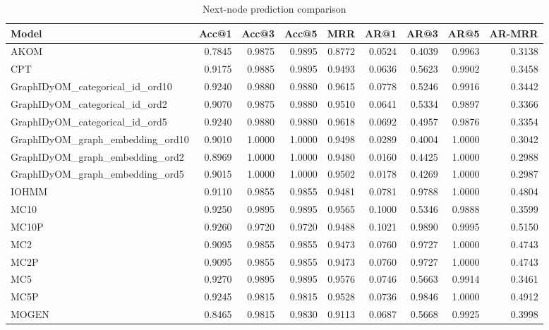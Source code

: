 \begin{table}
\caption{Next-node prediction comparison}
\label{tab:comparison}
\begin{tabular}{lrrrrrrrr}
\toprule
Model & Acc@1 & Acc@3 & Acc@5 & MRR & AR@1 & AR@3 & AR@5 & AR-MRR \\
\midrule
AKOM & 0.7845 & 0.9875 & 0.9895 & 0.8772 & 0.0524 & 0.4039 & 0.9963 & 0.3138 \\
CPT & 0.9175 & 0.9885 & 0.9895 & 0.9493 & 0.0636 & 0.5623 & 0.9902 & 0.3458 \\
GraphIDyOM_categorical_id_ord10 & 0.9240 & 0.9880 & 0.9880 & 0.9615 & 0.0778 & 0.5246 & 0.9916 & 0.3442 \\
GraphIDyOM_categorical_id_ord2 & 0.9070 & 0.9875 & 0.9880 & 0.9510 & 0.0641 & 0.5334 & 0.9897 & 0.3366 \\
GraphIDyOM_categorical_id_ord5 & 0.9240 & 0.9880 & 0.9880 & 0.9618 & 0.0692 & 0.4957 & 0.9876 & 0.3354 \\
GraphIDyOM_graph_embedding_ord10 & 0.9010 & 1.0000 & 1.0000 & 0.9498 & 0.0289 & 0.4004 & 1.0000 & 0.3042 \\
GraphIDyOM_graph_embedding_ord2 & 0.8969 & 1.0000 & 1.0000 & 0.9480 & 0.0160 & 0.4425 & 1.0000 & 0.2988 \\
GraphIDyOM_graph_embedding_ord5 & 0.9015 & 1.0000 & 1.0000 & 0.9502 & 0.0178 & 0.4269 & 1.0000 & 0.2987 \\
IOHMM & 0.9110 & 0.9855 & 0.9855 & 0.9481 & 0.0781 & 0.9788 & 1.0000 & 0.4804 \\
MC10 & 0.9250 & 0.9895 & 0.9895 & 0.9565 & 0.1000 & 0.5346 & 0.9888 & 0.3599 \\
MC10P & 0.9260 & 0.9720 & 0.9720 & 0.9488 & 0.1021 & 0.9890 & 0.9995 & 0.5150 \\
MC2 & 0.9095 & 0.9855 & 0.9855 & 0.9473 & 0.0760 & 0.9727 & 1.0000 & 0.4743 \\
MC2P & 0.9095 & 0.9855 & 0.9855 & 0.9473 & 0.0760 & 0.9727 & 1.0000 & 0.4743 \\
MC5 & 0.9270 & 0.9895 & 0.9895 & 0.9576 & 0.0746 & 0.5663 & 0.9914 & 0.3461 \\
MC5P & 0.9245 & 0.9815 & 0.9815 & 0.9528 & 0.0736 & 0.9846 & 1.0000 & 0.4912 \\
MOGEN & 0.8465 & 0.9815 & 0.9830 & 0.9113 & 0.0687 & 0.5668 & 0.9925 & 0.3998 \\
\bottomrule
\end{tabular}
\end{table}
